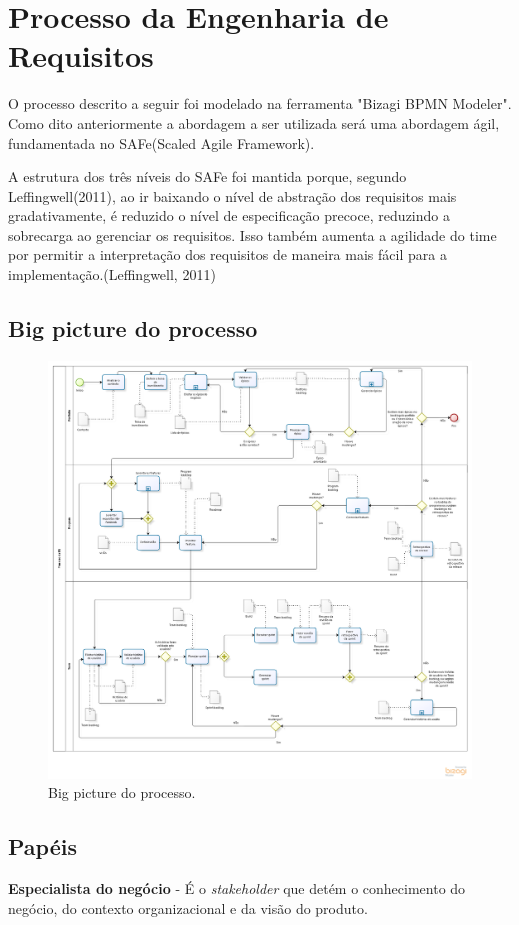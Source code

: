 \chapter[Processo da Engenharia de Requisitos]{Processo da Engenharia de Requisitos}
O processo descrito a seguir foi modelado na ferramenta "Bizagi BPMN Modeler". Como dito anteriormente a abordagem a ser utilizada será uma abordagem ágil, fundamentada no SAFe(Scaled Agile Framework).

A estrutura dos três níveis do SAFe foi mantida porque, segundo Leffingwell(2011), ao ir baixando o nível de abstração dos requisitos mais gradativamente, é reduzido o nível de especificação precoce, reduzindo a sobrecarga ao gerenciar os requisitos. Isso também aumenta a agilidade do time por permitir a interpretação dos requisitos de maneira mais fácil para a implementação.(Leffingwell, 2011)
\section{Big picture do processo}
  \begin{figure}[!htbp]
    \centering
    \includegraphics[scale=0.3]{figuras/Processo_v1-2}
    \caption[Big picture do processo.]{Big picture do processo. \footnotemark}
    \label{processo}
  \end{figure}
\section{Papéis}
\textbf{Especialista do negócio} - É o \textit{stakeholder} que detém o conhecimento do negócio, do contexto organizacional e da visão do produto.


